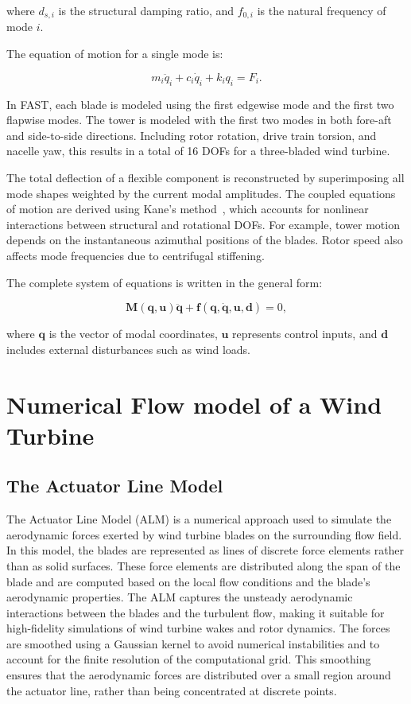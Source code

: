 where $d_{s,i}$ is the structural damping ratio, and $f_{0,i}$ is the natural frequency of mode $i$.

The equation of motion for a single mode is:

\begin{equation}
    m_i \ddot{q}_i + c_i \dot{q}_i + k_i q_i = F_i. \label{eq:single_mode_eom}
\end{equation}

In FAST, each blade is modeled using the first edgewise mode and the first two flapwise modes. The tower is modeled with the first two modes in both fore-aft and side-to-side directions. Including rotor rotation, drive train torsion, and nacelle yaw, this results in a total of 16 DOFs for a three-bladed wind turbine.

The total deflection of a flexible component is reconstructed by superimposing all mode shapes weighted by the current modal amplitudes. The coupled equations of motion are derived using Kane’s method~\cite{kane1985}, which accounts for nonlinear interactions between structural and rotational DOFs. For example, tower motion depends on the instantaneous azimuthal positions of the blades. Rotor speed also affects mode frequencies due to centrifugal stiffening.

The complete system of equations is written in the general form:

\begin{equation}
    \mathbf{M}(\mathbf{q}, \mathbf{u}) \ddot{\mathbf{q}} + \mathbf{f}(\mathbf{q}, \dot{\mathbf{q}}, \mathbf{u}, \mathbf{d}) = 0, \label{eq:general_eom}
\end{equation}

where $\mathbf{q}$ is the vector of modal coordinates, $\mathbf{u}$ represents control inputs, and $\mathbf{d}$ includes external disturbances such as wind loads.

\section{Numerical Flow model of a Wind Turbine}
\subsection{The Actuator Line Model} 

The Actuator Line Model (ALM) is a numerical approach used to simulate the aerodynamic forces exerted by wind turbine blades on the surrounding flow field. In this model, the blades are represented as lines of discrete force elements rather than as solid surfaces. These force elements are distributed along the span of the blade and are computed based on the local flow conditions and the blade's aerodynamic properties. The ALM captures the unsteady aerodynamic interactions between the blades and the turbulent flow, making it suitable for high-fidelity simulations of wind turbine wakes and rotor dynamics. The forces are smoothed using a Gaussian kernel to avoid numerical instabilities and to account for the finite resolution of the computational grid. This smoothing ensures that the aerodynamic forces are distributed over a small region around the actuator line, rather than being concentrated at discrete points.

